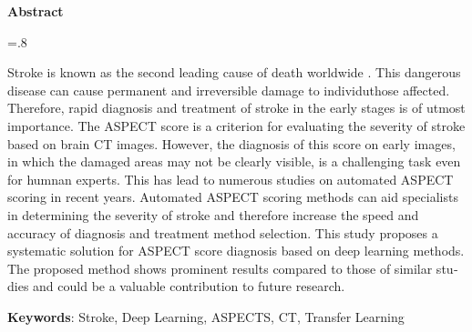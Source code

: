 


\pagestyle{empty}

\begin{latin}

\begin{center}
\textbf{Abstract}
\end{center}
\baselineskip=.8\baselineskip

Stroke is known as the second leading cause of death worldwide \cite{donkor2018stroke}.
This dangerous disease can cause permanent and irreversible damage to individuthose affected.
Therefore, rapid diagnosis and treatment of stroke in the early stages is of utmost importance.
The ASPECT score is a criterion for evaluating the severity of stroke based on brain CT images.
However, the diagnosis of this score on early images, in which the damaged areas may not be clearly visible, is a challenging task even for humnan experts.
This has lead to numerous studies on automated ASPECT scoring in recent years.
Automated ASPECT scoring methods can aid specialists in determining the severity of stroke and therefore increase the speed and accuracy of diagnosis and treatment method selection.
This study proposes a systematic solution for ASPECT score diagnosis based on deep learning methods.
The proposed method shows prominent results compared to those of similar studies and could be a valuable contribution to future research.

\bigskip\noindent\textbf{Keywords}:
Stroke, Deep Learning, ASPECTS, CT, Transfer Learning

\end{latin}
